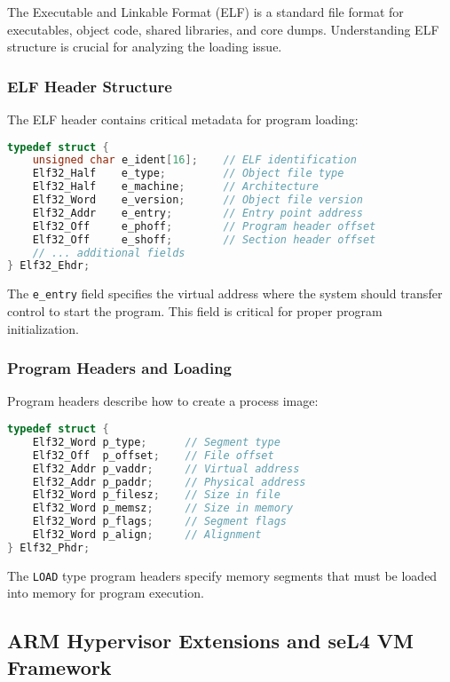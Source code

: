 \documentclass[11pt,a4paper]{article}
\begin{document}
The Executable and Linkable Format (ELF) is a standard file format for executables, object code, shared libraries, and core dumps. Understanding ELF structure is crucial for analyzing the loading issue.

\subsubsection{ELF Header Structure}

The ELF header contains critical metadata for program loading:

\begin{lstlisting}[language=C, caption=Relevant ELF Header Fields]
typedef struct {
    unsigned char e_ident[16];    // ELF identification
    Elf32_Half    e_type;         // Object file type
    Elf32_Half    e_machine;      // Architecture
    Elf32_Word    e_version;      // Object file version
    Elf32_Addr    e_entry;        // Entry point address
    Elf32_Off     e_phoff;        // Program header offset
    Elf32_Off     e_shoff;        // Section header offset
    // ... additional fields
} Elf32_Ehdr;
\end{lstlisting}

The \texttt{e\_entry} field specifies the virtual address where the system should transfer control to start the program. This field is critical for proper program initialization.

\subsubsection{Program Headers and Loading}

Program headers describe how to create a process image:

\begin{lstlisting}[language=C, caption=ELF Program Header Structure]
typedef struct {
    Elf32_Word p_type;      // Segment type
    Elf32_Off  p_offset;    // File offset
    Elf32_Addr p_vaddr;     // Virtual address
    Elf32_Addr p_paddr;     // Physical address
    Elf32_Word p_filesz;    // Size in file
    Elf32_Word p_memsz;     // Size in memory
    Elf32_Word p_flags;     // Segment flags
    Elf32_Word p_align;     // Alignment
} Elf32_Phdr;
\end{lstlisting}

The \texttt{LOAD} type program headers specify memory segments that must be loaded into memory for program execution.

\subsection{ARM Hypervisor Extensions and seL4 VM Framework}
\end{document}
